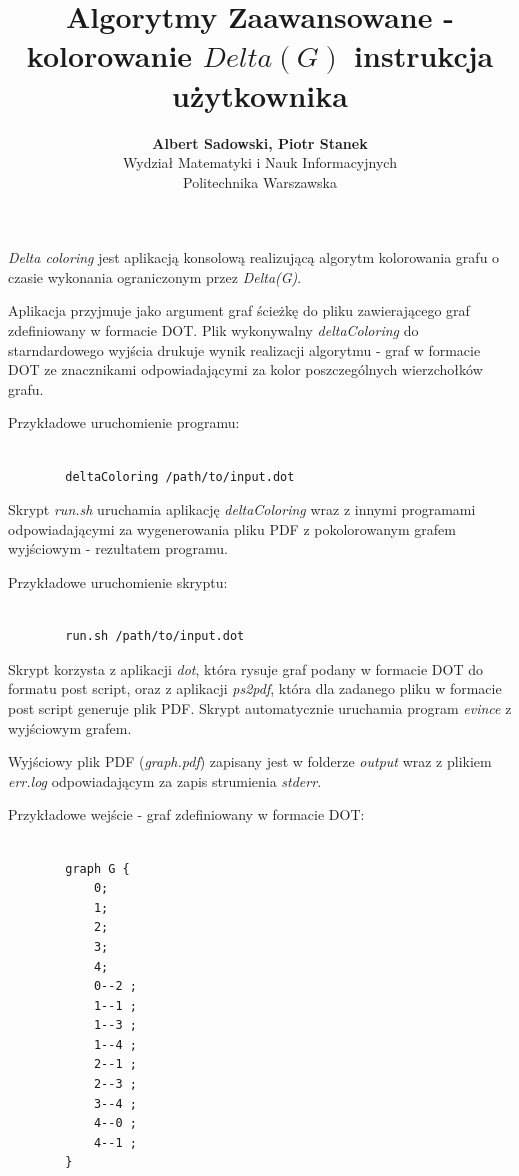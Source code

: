 \documentclass[a4paper]{article}
\title{\textbf{Algorytmy Zaawansowane - kolorowanie $Delta(G)$ instrukcja użytkownika}}
\author{\textbf{Albert Sadowski, Piotr Stanek}\\
	Wydział Matematyki i Nauk Informacyjnych\\
	Politechnika Warszawska}
\begin{document}
	\maketitle

	{\em Delta coloring} jest aplikacją konsolową realizującą algorytm kolorowania grafu o czasie wykonania ograniczonym przez {\em Delta(G)}.

	Aplikacja przyjmuje jako argument graf ścieżkę do pliku zawierającego graf zdefiniowany w formacie DOT. Plik wykonywalny {\em deltaColoring} do starndardowego wyjścia drukuje wynik realizacji algorytmu - graf w formacie DOT ze znacznikami odpowiadającymi za kolor poszczególnych wierzchołków grafu.

	Przykładowe uruchomienie programu:

	\begin{verbatim}

		deltaColoring /path/to/input.dot

	\end{verbatim}

	Skrypt {\em run.sh} uruchamia aplikację {\em deltaColoring} wraz z innymi programami odpowiadającymi za wygenerowania pliku PDF z pokolorowanym grafem wyjściowym - rezultatem programu. 

	Przykładowe uruchomienie skryptu:

	\begin{verbatim}

		run.sh /path/to/input.dot

	\end{verbatim}


	Skrypt korzysta z aplikacji {\em dot}, która rysuje graf podany w formacie DOT do formatu post script, oraz z aplikacji {\em ps2pdf}, która dla zadanego pliku w formacie post script generuje plik PDF. Skrypt automatycznie uruchamia program {\em evince} z wyjściowym grafem.

	Wyjściowy plik PDF ({\em graph.pdf}) zapisany jest w folderze {\em output} wraz z plikiem {\em err.log} odpowiadającym za zapis strumienia {\em stderr}.

	Przykładowe wejście - graf zdefiniowany w formacie DOT:

	\begin{verbatim}

		graph G {
			0;
			1;
			2;
			3;
			4;
			0--2 ;
			1--1 ;
			1--3 ;
			1--4 ;
			2--1 ;
			2--3 ;
			3--4 ;
			4--0 ;
			4--1 ;
		}
	

	\end{verbatim}
\end{document}
